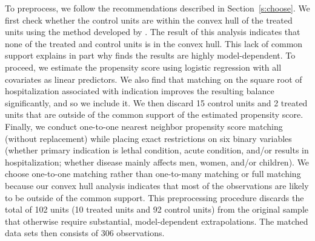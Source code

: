 \documentclass[11pt,titlepage]{article}
\begin{document}
To preprocess, we follow the recommendations described in
Section~\ref{s:choose}. We first check whether the control units are
within the convex hull of the treated units using the method developed
by \citet{KinZen06a}. The result of this analysis indicates that none
of the treated and control units is in the convex hull. This lack of
common support explains in part why \citet{Carpenter02} finds the
results are highly model-dependent. To proceed, we estimate the
propensity score using logistic regression with all covariates as
linear predictors.  We also find that matching on the square root of
hospitalization associated with indication improves the resulting
balance significantly, and so we include it.  We then discard 15
control units and 2 treated units that are outside of the common
support of the estimated propensity score. Finally, we conduct
one-to-one nearest neighbor propensity score matching (without
replacement) while placing exact restrictions on six binary variables
(whether primary indication is lethal condition, acute condition,
and/or results in hospitalization; whether disease mainly affects men,
women, and/or children). We choose one-to-one matching rather than
one-to-many matching or full matching because our convex hull analysis
indicates that most of the observations are likely to be outside of
the common support.  This preprocessing procedure discards the total
of 102 units (10 treated units and 92 control units) from the original
sample that otherwise require substantial, model-dependent
extrapolations. The matched data sets then consists of 306
observations.
\end{document}
